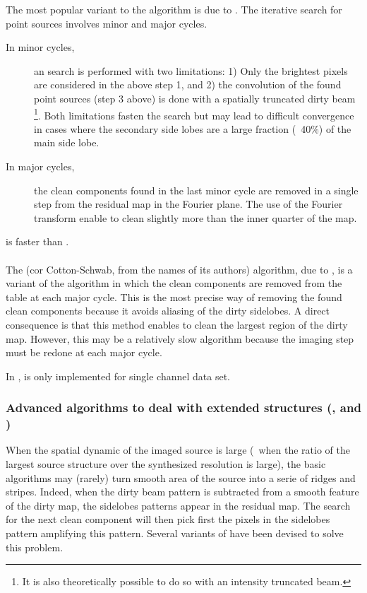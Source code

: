The most popular variant to the  algorithm is due to
\cite{clark80}. The iterative search for point sources involves minor and
major cycles.
\begin{description}
\item[In minor cycles,] an  search is performed with two
  limitations: 1) Only the brightest pixels are considered in the above
  step 1, and 2) the convolution of the found point sources (step 3 above)
  is done with a spatially truncated dirty beam 
  \footnote{It is also theoretically possible to do so with an intensity truncated beam.}. 
  Both limitations fasten
  the search but may lead to difficult convergence in cases where the
  secondary side lobes are a large fraction (\eg\ 40\%) of the main side
  lobe.
\item[In major cycles,] the clean components found in the last minor cycle
  are removed in a single step from the residual map in the Fourier plane.
  The use of the Fourier transform enable to clean slightly more than the
  inner quarter of the map.
\end{description}
 is faster than .

\paragraph{}

The  (cor Cotton-Schwab, from the names of its authors) 
algorithm, due to \citet{schwab84}, is a variant of the
 algorithm in which the clean components are removed from the
\uv{} table at each major cycle. This is the most precise way of removing
the found clean components because it avoids aliasing of the dirty
sidelobes. A direct consequence is that this method enables to clean the
largest region of the dirty map. However, this may be a relatively slow
algorithm because the imaging step must be redone at each major cycle.

In \imager{},  is only implemented for single channel data set.

\subsubsection{Advanced \clean{} algorithms to deal with extended
  structures (,  and )}

When the spatial dynamic of the imaged source is large (\ie\ when the ratio
of the largest source structure over the synthesized resolution is large),
the basic \clean{} algorithms may (rarely) turn smooth area of the source
into a serie of ridges and stripes. Indeed, when the dirty beam pattern is
subtracted from a smooth feature of the dirty map, the sidelobes patterns
appear in the residual map. The search for the next clean component will
then pick first the pixels in the sidelobes pattern amplifying this
pattern. Several variants of \clean{} have been devised to solve this
problem.

